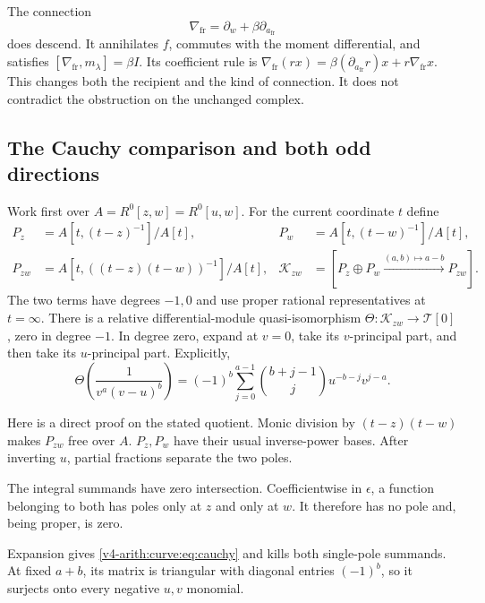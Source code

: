 The connection
\begin{equation}\label{v4-arith:curve:eq:framing-connection}
 \nabla_{\mathrm{fr}}=\partial_w+\beta\partial_{a_{\mathrm{fr}}}
\end{equation}
does descend. It annihilates $f$, commutes with the moment
differential, and satisfies
$[\nabla_{\mathrm{fr}},m_\lambda]=\beta I$.
Its coefficient rule is
$\nabla_{\mathrm{fr}}(rx)=\beta(\partial_{a_{\mathrm{fr}}}r)x+
r\nabla_{\mathrm{fr}}x$. This changes both the recipient and
the kind of connection. It does not contradict the
obstruction on the unchanged complex.

\subsection{The Cauchy comparison and both odd directions}

Work first over $A=R^0[z,w]=R^0[u,w]$.
For the current coordinate $t$ define
\[
 \begin{aligned}
 P_z&=A[t,(t-z)^{-1}]/A[t],&
 P_w&=A[t,(t-w)^{-1}]/A[t],\\
 P_{zw}&=A[t,((t-z)(t-w))^{-1}]/A[t],&
 \mathcal K_{zw}&=[P_z\oplus P_w\xrightarrow{(a,b)\mapsto a-b}P_{zw}].
 \end{aligned}
\]
The two terms have degrees $-1,0$ and use proper rational
representatives at $t=\infty$.
There is a relative differential-module quasi-isomorphism
$\Theta:\mathcal K_{zw}\to\mathcal T[0]$, zero in degree $-1$.
In degree zero, expand at $v=0$, take its $v$-principal
part, and then take its $u$-principal part.
Explicitly,
\begin{equation}\label{v4-arith:curve:eq:cauchy}
 \Theta\left(\frac1{v^a(v-u)^b}\right)
 =(-1)^b\sum_{j=0}^{a-1}
       \binom{b+j-1}{j}u^{-b-j}v^{j-a}.
\end{equation}

Here is a direct proof on the stated quotient. Monic
division by $(t-z)(t-w)$ makes $P_{zw}$ free over $A$.
$P_z,P_w$ have their usual inverse-power bases.
After inverting $u$, partial fractions separate the two
poles.

The integral summands have zero intersection.
Coefficientwise in $\epsilon$, a function belonging to
both has poles only at $z$ and only at $w$.
It therefore has no pole and, being proper, is zero.

Expansion gives
\eqref{v4-arith:curve:eq:cauchy} and kills both single-pole
summands. At fixed $a+b$, its matrix is triangular with
diagonal entries $(-1)^b$, so it surjects onto every
negative $u,v$ monomial.

